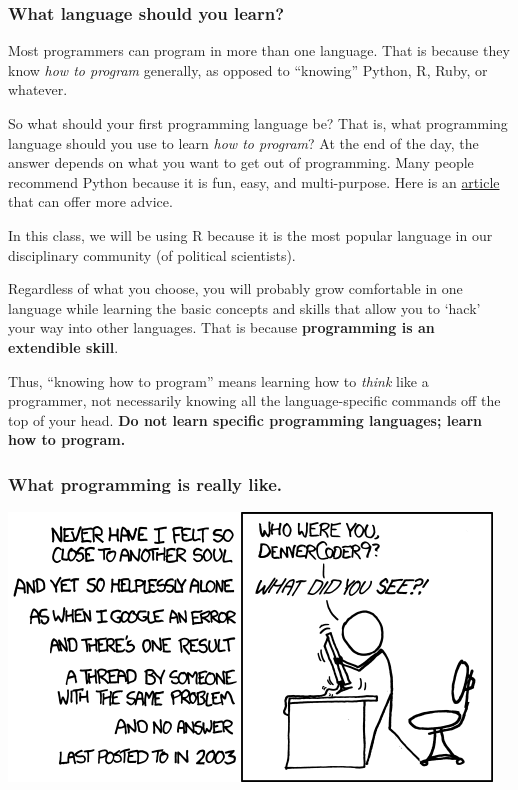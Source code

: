 \documentclass[]{book}
\begin{document}
\subsubsection*{What language should you
learn?}\label{what-language-should-you-learn}

Most programmers can program in more than one language. That is because
they know \emph{how to program} generally, as opposed to ``knowing''
Python, R, Ruby, or whatever.

So what should your first programming language be? That is, what
programming language should you use to learn \emph{how to program}? At
the end of the day, the answer depends on what you want to get out of
programming. Many people recommend Python because it is fun, easy, and
multi-purpose. Here is an
\href{http://lifehacker.com/which-programming-language-should-i-learn-first-1477153665}{article}
that can offer more advice.

In this class, we will be using R because it is the most popular
language in our disciplinary community (of political scientists).

Regardless of what you choose, you will probably grow comfortable in one
language while learning the basic concepts and skills that allow you to
`hack' your way into other languages. That is because
\textbf{programming is an extendible skill}.

Thus, ``knowing how to program'' means learning how to \emph{think} like
a programmer, not necessarily knowing all the language-specific commands
off the top of your head. \textbf{Do not learn specific programming
languages; learn how to program.}

\subsubsection*{What programming is really
like.}\label{what-programming-is-really-like.}

\begin{center}\includegraphics[width=0.7\linewidth]{img/xkcd} \end{center}
\end{document}
